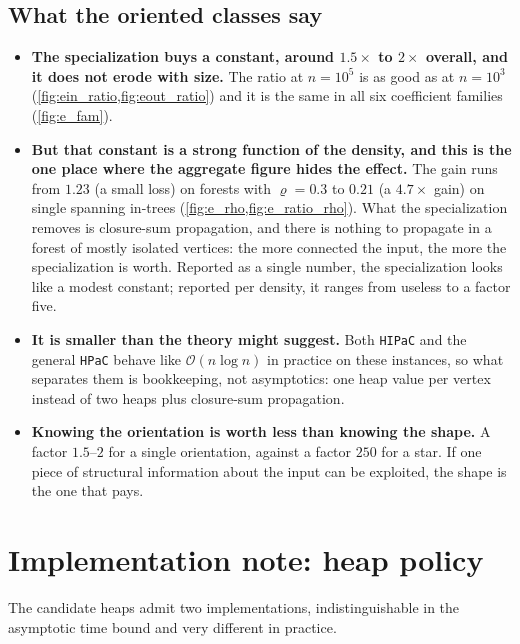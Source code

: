 \documentclass[11pt]{article}
\begin{document}
\subsection{What the oriented classes say}

\begin{itemize}
  \item \textbf{The specialization buys a constant, around $1.5\times$ to
  $2\times$ overall, and it does not erode with size.} The ratio at $n=10^5$ is
  as good as at $n=10^3$ (\cref{fig:ein_ratio,fig:eout_ratio}) and it is the same
  in all six coefficient families (\cref{fig:e_fam}).
  \item \textbf{But that constant is a strong function of the density, and this
  is the one place where the aggregate figure hides the effect.} The gain runs
  from $1.23$ (a small loss) on forests with $\varrho=0.3$ to $0.21$ (a
  $4.7\times$ gain) on single spanning in-trees (\cref{fig:e_rho,fig:e_ratio_rho}).
  What the specialization removes is closure-sum propagation, and there is
  nothing to propagate in a forest of mostly isolated vertices: the more
  connected the input, the more the specialization is worth. Reported as a single
  number, the specialization looks like a modest constant; reported per density,
  it ranges from useless to a factor five.
  \item \textbf{It is smaller than the theory might suggest.} Both
  \texttt{HIPaC} and the general \texttt{HPaC} behave like
  $\mathcal O(n\log n)$ in practice on these instances, so what separates them
  is bookkeeping, not asymptotics: one heap value per vertex instead of two
  heaps plus closure-sum propagation.
  \item \textbf{Knowing the orientation is worth less than knowing the
  shape.} A factor $1.5$--$2$ for a single orientation, against a factor $250$
  for a star. If one piece of structural information about the input can be
  exploited, the shape is the one that pays.
\end{itemize}

\section{Implementation note: heap policy}\label{sec:heap}

The candidate heaps admit two implementations, indistinguishable in the
asymptotic time bound and very different in practice.
\end{document}
